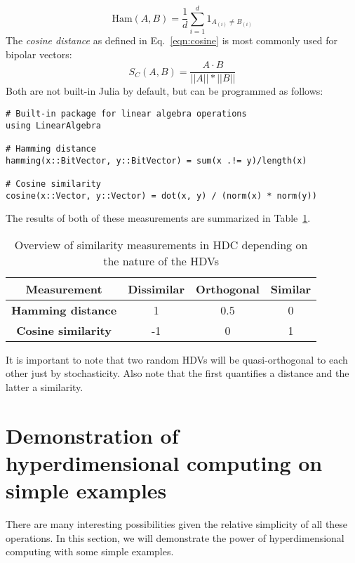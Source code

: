 \begin{equation}
    \label{eqn:Hamming}
    \text{Ham}(A, B) = \frac{1}{d} \sum_{i=1}^{d} 1_{A_{(i)} \neq B_{(i)}}
\end{equation}
The \textit{cosine distance} as defined in Eq.~\ref{eqn:cosine} is most commonly used for bipolar vectors:
\begin{equation}
    \label{eqn:cosine}
    S_{C}(A, B) = \frac{A \cdot B}{||A|| * ||B||}
\end{equation}
Both are not built-in Julia by default, but can be programmed as follows:
\begin{verbatim}
# Built-in package for linear algebra operations 
using LinearAlgebra

# Hamming distance
hamming(x::BitVector, y::BitVector) = sum(x .!= y)/length(x)

# Cosine similarity
cosine(x::Vector, y::Vector) = dot(x, y) / (norm(x) * norm(y))
\end{verbatim}
The results of both of these measurements are summarized in Table~\ref{tab:dist}.
\begin{table}[h]
    \centering
    \caption{\label{tab:dist}Overview of similarity measurements in HDC depending on the nature of the HDVs}
    \begin{tabular}{|cccc|}
        \hline
        \textbf{Measurement} & \textbf{Dissimilar} & \textbf{Orthogonal} & \textbf{Similar} \\
        \hline
        \textbf{Hamming distance} & 1 & 0.5 & 0 \\
        \hline
        \textbf{Cosine similarity} & -1 & 0 & 1 \\
        \hline
    \end{tabular} 
\end{table}

It is important to note that two random HDVs will be quasi-orthogonal to each other just by stochasticity. Also note that the first quantifies a distance and the latter a similarity.
\section{Demonstration of hyperdimensional computing on simple examples}
There are many interesting possibilities given the relative simplicity of all these operations. In this section, we will demonstrate the power of hyperdimensional computing with some simple examples.
